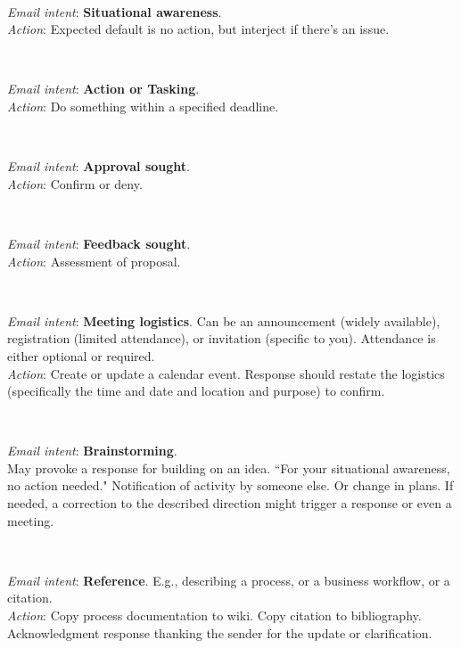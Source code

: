 \ \\
\begin{samepage}
\textit{Email intent}: \textbf{Situational awareness}.\\
\textit{Action}: Expected default is no action, but interject if there's an issue.
\end{samepage}

\ \\
\begin{samepage}
\textit{Email intent}: \textbf{Action or Tasking}.\\
\textit{Action}: Do something within a specified deadline.
\end{samepage}

\ \\
\begin{samepage}
\textit{Email intent}: \textbf{Approval sought}.\\
\textit{Action}: Confirm or deny.
\end{samepage}

\ \\
\begin{samepage}
\textit{Email intent}: \textbf{Feedback sought}.\\
\textit{Action}: Assessment of proposal.
\end{samepage}

\ \\
\begin{samepage}
\textit{Email intent}: \textbf{Meeting logistics}. Can be an announcement (widely available), registration (limited attendance), or invitation (specific to you). Attendance is either optional or required. \\
\textit{Action}: Create or update a calendar event.
Response should restate the logistics (specifically the time and date and location and purpose) to confirm. 
\end{samepage}

\ \\
\begin{samepage}
\textit{Email intent}: \textbf{Brainstorming}.\\
May provoke a response for building on an idea.
``For your situational awareness, no action needed." Notification of activity by someone else. Or change in plans. 
If needed, a correction to the described direction might trigger a response or even a meeting.
\end{samepage}

\ \\
\begin{samepage}
\textit{Email intent}: \textbf{Reference}. E.g., describing a process, or a business workflow, or a citation.\\
\textit{Action}: Copy process documentation to wiki. Copy citation to bibliography.
Acknowledgment response thanking the sender for the update or clarification.
\end{samepage}

